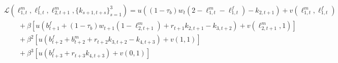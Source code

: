 \begin{equation}
	\label{eq:lagrangian}
	\begin{aligned}
		&\mathcal{L}(\ell_{1,t}^m,\ell_{1,t}^f,\ell_{2,t+1}^m,\{k_{s+1,t+s}\}_{s=1}^3) = u\left((1-\tau_b)w_t (2-\ell_{1,t}^m - \ell_{1,t}^f) -k_{2,t+1}\right) + v(\ell_{1,t}^m,\ell_{1,t}^f)  \\
		&\qquad + \beta \left[ u\left(b_{t+1}^f+(1-\tau_b)w_{t+1} (1-\ell_{2,t+1}^m ) + r_{t+1}k_{2,t+1} -k_{3,t+2}\right) + v(\ell_{2,t+1}^m,1) \right]\\
		&\qquad + \beta^{2} \left[ u\left(b_{t+2}^f+ b_{t+2}^m  + r_{t+2}k_{3,t+2} -k_{4,t+3}\right) + v(1,1) \right]\\
		&\qquad + \beta^{3} \left[ u\left(b_{t+3}^f + r_{t+3}k_{4,t+3}\right) + v(0,1) \right]
	\end{aligned}
\end{equation}